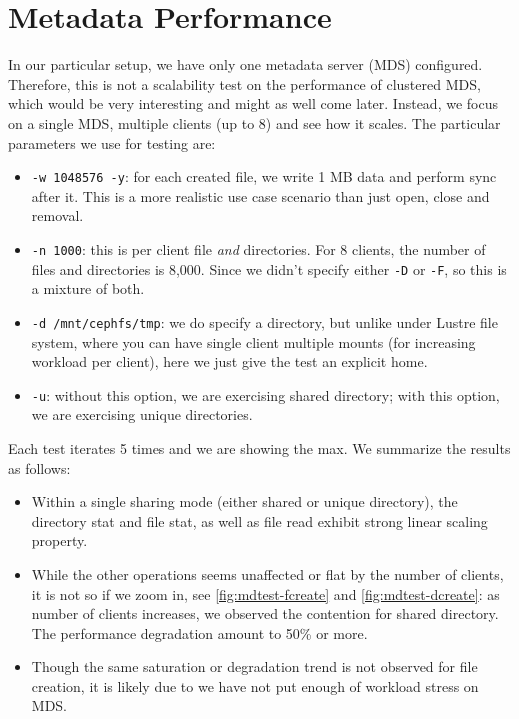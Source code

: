 \documentclass{article}
\begin{document}
\section{Metadata Performance}


In our particular setup, we have only one metadata server (MDS)
configured. Therefore, this is not a scalability test on the performance of
clustered MDS, which would be very interesting and might as well come later.
Instead, we focus on a single MDS, multiple clients (up to 8) and see how it
scales. The particular parameters we use for testing are:

\begin{itemize}
\item \verb!-w 1048576 -y!: for each created file, we write 1 MB data and
perform sync after it. This is a more realistic use case scenario than just
open, close and removal.

\item \verb!-n 1000!: this is per client file \textit{and} directories. For 8
clients, the number of files and directories is 8,000. Since we didn't specify
either \verb!-D! or \verb!-F!, so this is a mixture of both.

\item \verb!-d /mnt/cephfs/tmp!: we do specify a directory, but unlike under
Lustre file system, where you can have single client multiple mounts (for
increasing workload per client), here we just give the test an explicit home.

\item \verb!-u!: without this option, we are exercising shared directory; with
this option, we are exercising unique directories.

\end{itemize}

Each test iterates 5 times and we are showing the max. 
We summarize the results as follows:


\begin{itemize}

\item Within a single sharing mode (either shared or unique directory), the
directory stat and file stat, as well as file read exhibit strong linear
scaling property. 

\item While the other operations seems unaffected or flat by the number of
clients, it is not so if we zoom in, see \ref{fig:mdtest-fcreate} and
\ref{fig:mdtest-dcreate}:  as number of clients increases, we observed the
contention for shared directory. The performance degradation amount to 50\% or
more.

\item Though the same saturation or degradation trend is not observed for file
creation, it is likely due to we have not put enough of workload stress on MDS.

\end{itemize}
\end{document}
